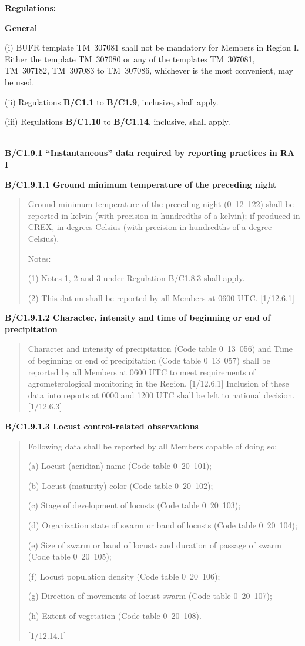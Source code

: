 \textbf{Regulations:}

\textbf{General}

(i) BUFR template TM~307081 shall not be mandatory for Members in Region I. Either the template TM~307080 or any of the templates TM~307081, TM~307182, TM~307083 to TM~307086, whichever is the most convenient, may be used.

(ii) Regulations \textbf{B/C1.1} to \textbf{B/C1.9}, inclusive, shall apply.

(iii) Regulations \textbf{B/C1.10} to \textbf{B/C1.14}, inclusive, shall apply.

\textbf{\\
B/C1.9.1 ``Instantaneous'' data required by reporting practices in RA I}

\textbf{B/C1.9.1.1 Ground minimum temperature of the preceding night}

\begin{quote}
Ground minimum temperature of the preceding night (0~12~122) shall be reported in kelvin (with precision in hundredths of a kelvin); if produced in CREX, in degrees Celsius (with precision in hundredths of a degree Celsius).

Notes:

(1) Notes 1, 2 and 3 under Regulation B/C1.8.3 shall apply.

(2) This datum shall be reported by all Members at 0600 UTC. {[}1/12.6.1{]}
\end{quote}

\textbf{B/C1.9.1.2 Character, intensity and time of beginning or end of precipitation}

\begin{quote}
Character and intensity of precipitation (Code table 0~13~056) and Time of beginning or end of precipitation (Code table 0~13~057) shall be reported by all Members at 0600 UTC to meet requirements of agrometerological monitoring in the Region. {[}1/12.6.1{]} Inclusion of these data into reports at 0000 and 1200 UTC shall be left to national decision. {[}1/12.6.3{]}
\end{quote}

\textbf{B/C1.9.1.3 Locust control-related observations}

\begin{quote}
Following data shall be reported by all Members capable of doing so:

(a) Locust (acridian) name (Code table 0~20~101);

(b) Locust (maturity) color (Code table 0~20~102);

(c) Stage of development of locusts (Code table 0~20~103);

(d) Organization state of swarm or band of locusts (Code table 0~20~104);

(e) Size of swarm or band of locusts and duration of passage of swarm (Code table 0~20~105);

(f) Locust population density (Code table 0~20~106);

(g) Direction of movements of locust swarm (Code table 0~20~107);

(h) Extent of vegetation (Code table 0~20~108).

{[}1/12.14.1{]}
\end{quote}


